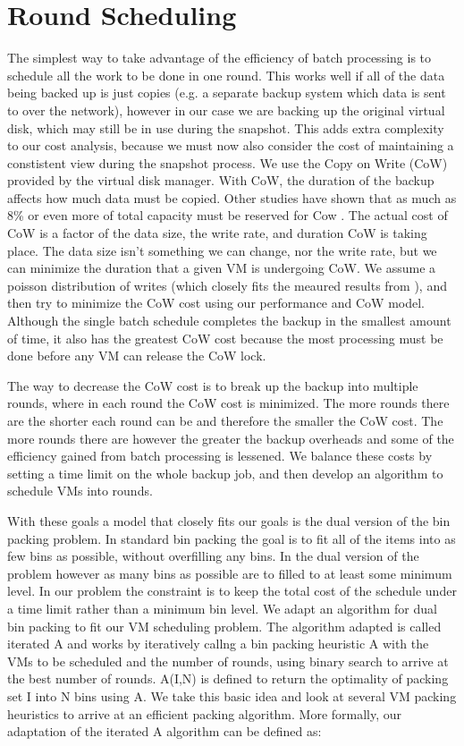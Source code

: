 \section{Round Scheduling}
\label{sect:scheduling}
The simplest way to take advantage of the efficiency of batch processing is to
schedule all the work to be done in one round.  This works well if all of the
data being backed up is just copies (e.g. a separate backup system which data
is sent to over the network), however in our case we are backing up the
original virtual disk, which may still be in use during the snapshot. This adds
extra complexity to our cost analysis, because we must now also consider the
cost of maintaining a constistent view during the snapshot process. We use the
Copy on Write (CoW) provided by the virtual disk manager. With CoW, the
duration of the backup affects how much data must be copied. Other studies have
shown that as much as 8\% or even more of total capacity must be reserved for
Cow \cite{EMCIncrementalDataChanges}. The actual cost of CoW is a factor of the
data size, the write rate, and duration CoW is taking place. The data size
isn't something we can change, nor the write rate, but we can minimize the
duration that a given VM is undergoing CoW. We assume a poisson distribution of
writes (which closely fits the meaured results from
\cite{EMCIncrementalDataChanges}), and then try to minimize the CoW cost using
our performance and CoW model. Although the single batch schedule completes the
backup in the smallest amount of time, it also has the greatest CoW cost
because the most processing must be done before any VM can release the CoW
lock.

The way to decrease the CoW cost is to break up the backup into multiple
rounds, where in each round the CoW cost is minimized. The more rounds there
are the shorter each round can be and therefore the smaller the CoW cost. The
more rounds there are however the greater the backup overheads and some of the
efficiency gained from batch processing is lessened. We balance these costs by
setting a time limit on the whole backup job, and then develop an algorithm to
schedule VMs into rounds.

With these goals a model that closely fits our goals is the dual version of the
bin packing problem. In standard bin packing the goal is to fit all of the
items into as few bins as possible, without overfilling any bins. In the dual
version of the problem however as many bins as possible are to filled to at
least some minimum level. In our problem the constraint is to keep the total
cost of the schedule under a time limit rather than a minimum bin level. We
adapt an algorithm for dual bin packing\cite{DualBinPacking} to fit our VM
scheduling problem. The algorithm adapted is called iterated A and works by
iteratively callng a bin packing heuristic A with the VMs to be scheduled and
the number of rounds, using binary search to arrive at the best number of
rounds. A(I,N) is defined to return the optimality of packing set I into N bins
using A. We take this basic idea and look at several VM packing heuristics to
arrive at an efficient packing algorithm. More formally, our adaptation of the
iterated A algorithm can be defined as:

